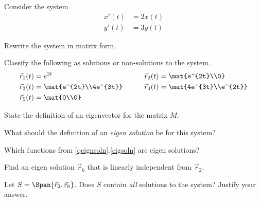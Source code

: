 \documentclass{workbook}
\begin{document}
\begin{slide}
	\question
	\label{qeignsoln}
	Consider the system
	\begin{align*}
		x'(t) &= 2x(t)\\
		y'(t) &= 3y(t)
	\end{align*}

	\begin{parts}
		\item Rewrite the system in matrix form.
		\item 
		\label{eigsoln}
		Classify the following as solutions or non-solutions to the system.
		\begin{align*}
			\vec r_1(t) &= e^{2t} &\qquad			\vec r_2(t) &= \mat{e^{2t}\\0}\\
			\vec r_3(t) &= \mat{e^{2t}\\4e^{3t}} &\qquad			\vec r_4(t) &= \mat{4e^{3t}\\e^{2t}}\\
			\vec r_5(t) &= \mat{0\\0}
		\end{align*}
		\item State the definition of an eigenvector for the matrix $M$.
		\item What should the definition of an \emph{eigen solution} be for this system?
		\item Which functions from \ref{qeignsoln}.\ref{eigsoln} are eigen solutions?
		\item Find an eigen solution $\vec r_6$ that is linearly independent from $\vec r_2$.
		\item Let $S=\Span\{\vec r_2, \vec r_6\}$. Does $S$ contain \emph{all} solutions to the system? Justify your answer.
	
	\end{parts}
\end{slide}
\end{document}
